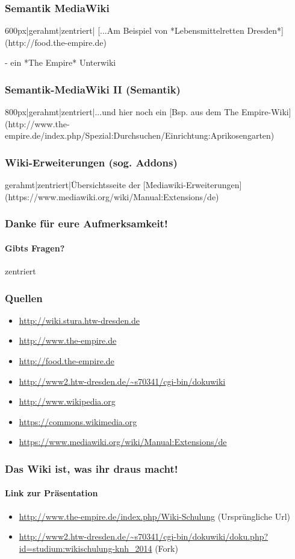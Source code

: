 \documentclass{beamer}
\begin{document}
\begin{frame}
  \frametitle{Semantik MediaWiki}

  600px|gerahmt|zentriert| [...Am Beispiel von *Lebensmittelretten Dresden*](http://food.the-empire.de)

   - ein *The Empire* Unterwiki
\end{frame}
  
\begin{frame}
  \frametitle{Semantik-MediaWiki II (Semantik)}

  800px|gerahmt|zentriert|...und hier noch ein [Bsp. aus dem The Empire-Wiki](http://www.the-empire.de/index.php/Spezial:Durchsuchen/Einrichtung:Aprikosengarten)

\end{frame}


\begin{frame}
  \frametitle{Wiki-Erweiterungen (sog. Addons)}

  gerahmt|zentriert|Übersichtsseite der [Mediawiki-Erweiterungen](https://www.mediawiki.org/wiki/Manual:Extensions/de)

\end{frame}


\begin{frame}
  \frametitle{Danke für eure Aufmerksamkeit!}
  \framesubtitle{Gibts Fragen?}

  zentriert

\end{frame}


\begin{frame}
  \frametitle{Quellen}
  \begin{itemize}
    \item \url{http://wiki.stura.htw-dresden.de}
    \item \url{http://www.the-empire.de}
    \item \url{http://food.the-empire.de}
    \item \url{http://www2.htw-dresden.de/~s70341/cgi-bin/dokuwiki}
    \item \url{http://www.wikipedia.org}
    \item \url{https://commons.wikimedia.org}
    \item \url{https://www.mediawiki.org/wiki/Manual:Extensions/de}
  \end{itemize}
\end{frame}

\begin{frame}
  \frametitle{Das Wiki ist, was ihr draus macht!}
  \framesubtitle{Link zur Präsentation}
  \begin{itemize}
    \item \url{http://www.the-empire.de/index.php/Wiki-Schulung} (Ursprüngliche Url)
    \item \url{http://www2.htw-dresden.de/~s70341/cgi-bin/dokuwiki/doku.php?id=studium:wikischulung-knh_2014} (Fork)
  \end{itemize}
\end{frame}
\end{document}
